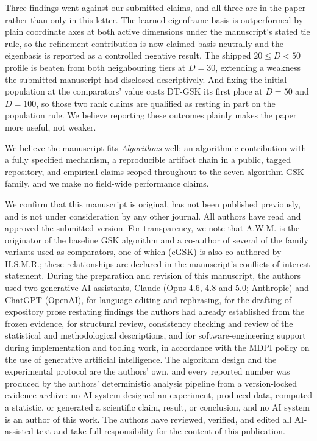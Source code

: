 \documentclass[11pt,a4paper]{article}
\newcommand{\dtgsk}{DT-GSK}
\begin{document}
Three findings went against our submitted claims, and all three are in the paper rather than only in this letter. The learned eigenframe basis is outperformed by plain coordinate axes at both active dimensions under the manuscript's stated tie rule, so the refinement contribution is now claimed basis-neutrally and the eigenbasis is reported as a controlled negative result. The shipped $20 \le D < 50$ profile is beaten from both neighbouring tiers at $D = 30$, extending a weakness the submitted manuscript had disclosed descriptively. And fixing the initial population at the comparators' value costs \dtgsk{} its first place at $D = 50$ and $D = 100$, so those two rank claims are qualified as resting in part on the population rule. We believe reporting these outcomes plainly makes the paper more useful, not weaker.

We believe the manuscript fits \textit{Algorithms} well: an algorithmic contribution with a fully specified mechanism, a reproducible artifact chain in a public, tagged repository, and empirical claims scoped throughout to the seven-algorithm GSK family, and we make no field-wide performance claims.

We confirm that this manuscript is original, has not been published previously, and is not under consideration by any other journal. All authors have read and approved the submitted version. For transparency, we note that A.W.M. is the originator of the baseline GSK algorithm and a co-author of several of the family variants used as comparators, one of which (eGSK) is also co-authored by H.S.M.R.; these relationships are declared in the manuscript's conflicts-of-interest statement. During the preparation and revision of this manuscript, the authors used two generative-AI assistants, Claude (Opus 4.6, 4.8 and 5.0; Anthropic) and ChatGPT (OpenAI), for language editing and rephrasing, for the drafting of expository prose restating findings the authors had already established from the frozen evidence, for structural review, consistency checking and review of the statistical and methodological descriptions, and for software-engineering support during implementation and tooling work, in accordance with the MDPI policy on the use of generative artificial intelligence. The algorithm design and the experimental protocol are the authors' own, and every reported number was produced by the authors' deterministic analysis pipeline from a version-locked evidence archive: no AI system designed an experiment, produced data, computed a statistic, or generated a scientific claim, result, or conclusion, and no AI system is an author of this work. The authors have reviewed, verified, and edited all AI-assisted text and take full responsibility for the content of this publication.
\end{document}

